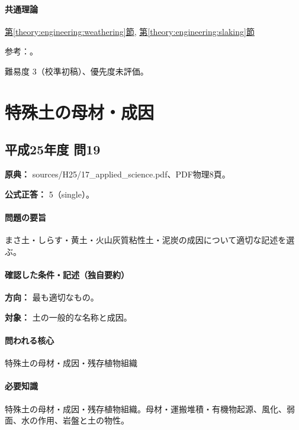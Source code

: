 \paragraph{共通理論} \hyperref[theory:engineering:weathering]{第\ref*{theory:engineering:weathering}節}, \hyperref[theory:engineering:slaking]{第\ref*{theory:engineering:slaking}節}

\par 参考：\cite{slaking1979,slaking2006,jseg_engineering_faq}。

\par 難易度 3（校準初稿）、優先度未評価。

\section{特殊土の母材・成因}

\subsection{平成25年度 問19}
\label{q:h25-reg-applied-19}

\noindent\textbf{原典：} sources/H25/17\_applied\_science.pdf、PDF物理8頁。

\textbf{公式正答：} 5（single）。

\paragraph{問題の要旨} まさ土・しらす・黄土・火山灰質粘性土・泥炭の成因について適切な記述を選ぶ。

\paragraph{確認した条件・記述（独自要約）}\mbox{}\par

\noindent\textbf{方向：} 最も適切なもの。\par

\noindent\textbf{対象：} 土の一般的な名称と成因。\par

\paragraph{問われる核心} 特殊土の母材・成因・残存植物組織

\paragraph{必要知識} 特殊土の母材・成因・残存植物組織。母材・運搬堆積・有機物起源、風化、弱面、水の作用、岩盤と土の物性。

